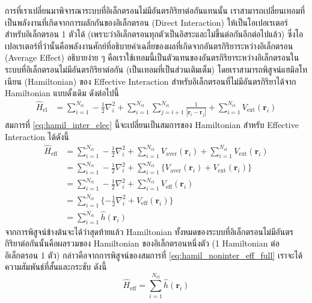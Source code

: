 การที่เราเปลี่ยนมาพิจารณาระบบที่อิเล็กตรอนไม่มีอันตรกิริยาต่อกันแทนนั้น เราสามารถเปลี่ยนเทอมที่เป็นพลังงานที่เกิดจากการผลักกันของอิเล็กตรอน (Direct Interaction) ให้เป็นโอเปอเรเตอร์สำหรับอิเล็กตรอน 1 ตัวได้ (เพราะว่าอิเล็กตรอนทุกตัวเป็นอิสระและไม่ขึ้นต่อกันอีกต่อไปแล้ว) ซึ่งโอเปอเรเตอร์ที่ว่านั้นคือพลังงานศักย์ที่อธิบายค่าเฉลี่ยของผลที่เกิดจากอันตรกิริยาระหว่างอิเล็กตรอน (Average Effect) อธิบายง่าย ๆ คือเราใช้เทอมนี้เป็นตัวแทนของอันตรกิริยาระหว่างอิเล็กตรอนในระบบที่อิเล็กตรอนไม่มีอันตรกิริยาต่อกัน (เป็นเทอมที่เป็นส่วนเติมเต็ม) โดยเราสามารถพิสูจน์แฮมิลโทเนียน (Hamiltonian) ของ Effective Interaction สำหรับอิเล็กตรอนที่ไม่มีอันตรกิริยาได้จาก Hamiltonian แบบดั้งเดิม ดังต่อไปนี้
%
\begin{align}\label{eq:hamil_inter_elec}
    \hat{H}_{\text{el}} & = \sum^{N_{\text{el}}}_{i=1} -\frac{1}{2} \nabla^{2}_{i}
    + \sum^{N_{\text{el}}}_{i=1} \sum^{N_{\text{el}}}_{j=i+1} \frac{1}{|\bm{r}_{i}-\bm{r}_{j}|}
    + \sum^{N_{\text{el}}}_{i=1} V_{\text{ext}}(\bm{r}_{i})
\end{align}
%
\noindent สมการที่ \eqref{eq:hamil_inter_elec} นี้จะเปลี่ยนเป็นสมการของ Hamiltonian สำหรับ Effective Interaction ได้ดังนี้
%
\begin{align}\label{eq:hamil_noninter_eff_full}
    \hat{H}_{\text{eff}} & = \sum^{N_{\text{el}}}_{i=1} -\frac{1}{2} \nabla^{2}_{i}
    + \sum^{N_{\text{el}}}_{i=1} V_{\text{aver}}(\bm{r}_{i})
    + \sum^{N_{\text{el}}}_{i=1} V_{\text{ext}}(\bm{r}_{i}) \nonumber                                                            \\
                         & = \sum^{N_{\text{el}}}_{i=1} -\frac{1}{2} \nabla^{2}_{i}
    + \sum^{N_{\text{el}}}_{i=1} \{ V_{\text{aver}}(\bm{r}_{i}) + V_{\text{ext}}(\bm{r}_{i}) \} \nonumber                        \\
                         & = \sum^{N_{\text{el}}}_{i=1} -\frac{1}{2} \nabla^{2}_{i}
    + \sum^{N_{\text{el}}}_{i=1} V_{\text{eff}}(\bm{r}_{i}) \nonumber                                                            \\
                         & = \sum^{N_{\text{el}}}_{i=1} \{ -\frac{1}{2} \nabla^{2}_{i} + V_{\text{eff}}(\bm{r}_{i}) \} \nonumber \\
                         & = \sum^{N_{\text{el}}}_{i=1} \hat{h}(\bm{r}_{i})
\end{align}
%
จากการพิสูจน์ข้างต้นจะได้ว่าสุดท้ายแล้ว Hamiltonian ทั้งหมดของระบบที่อิเล็กตรอนไม่มีอันตรกิริยาต่อกันนั้นคือผลรวมของ Hamiltonian ของอิเล็กตรอนหนึ่งตัว (1 Hamiltonian ต่ออิเล็กตรอน 1 ตัว) กล่าวคือจากการพิสูจน์ของสมการที่ \eqref{eq:hamil_noninter_eff_full} เราจะได้ความสัมพันธ์ที่สั้นและกระชับ ดังนี้
%
\begin{equation}\label{eq:hamil_noninter_eff}
    \hat{H}_{\text{eff}} = \sum^{N_{\text{el}}}_{i=1} \hat{h}(\bm{r}_{i})
\end{equation}

